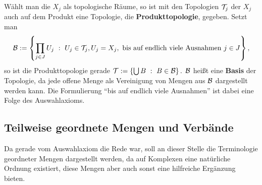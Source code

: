Wählt man die $X_j$ als topologische Räume, so ist mit den Topologien
${\cal T}_j$ der $X_j$ auch auf dem Produkt eine Topologie, die
{\bf Produkttopologie},  gegeben. Setzt man
$${\cal B}:=\left\{\prod\limits_{j\in J}U_j~:~U_j\in{\cal T}_j, U_j=X_j,\mbox{ bis auf
endlich viele Ausnahmen } j\in J\right\},$$
so ist die Produkttopologie gerade ${\cal T} := \left\{\bigcup B~:~B\in{\cal B}\right\}.$
${\cal B}$ heißt eine {\bf Basis} der Topologie, da jede
offene Menge als Vereinigung von Mengen aus ${\cal B}$ dargestellt werden kann. Die
Formulierung "`bis auf endlich viele Ausnahmen"' ist dabei eine Folge des
Auswahlaxioms.

\subsection{Teilweise geordnete Mengen und Verbände}

Da gerade vom Auswahlaxiom die Rede war, soll an dieser Stelle die Terminologie
geordneter Mengen dargestellt werden, da auf Komplexen eine natürliche Ordnung
existiert, diese Mengen aber auch sonst eine hilfreiche Ergänzung bieten.

